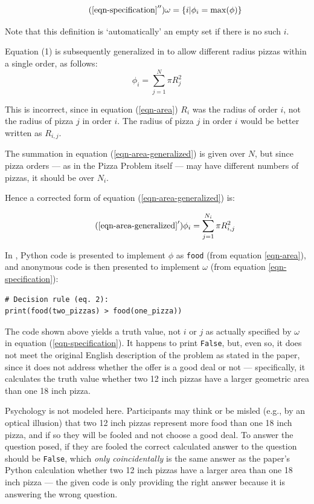 \documentclass[11pt]{article}
\begin{document}
\begin{equation}\tag{$\ref{eqn-specification}^{\prime\prime}$}\label{eqn-set-corrected-specification}
\omega=\left\{i| \phi_i=\max(\phi)\right\}
\end{equation}

Note that this definition is `automatically' an empty set if there is no such $i$.

Equation (1) is subsequently generalized in \cite{pizzap} to allow different radius pizzas within a single order, as follows:
\begin{equation}\label{eqn-area-generalized}
\phi_i=\sum_{j=1}^N \pi R_j^2
\end{equation}

This is incorrect, since in equation (\ref{eqn-area}) $R_i$ was the radius of order $i$, not the radius of pizza $j$ in order $i$. The radius of pizza $j$ in order $i$ would be better written as $R_{i,j}$. 

The summation in equation (\ref{eqn-area-generalized}) is given over $N$, but since pizza orders --- as in the Pizza Problem itself --- may have different numbers of pizzas, it should be over $N_i$.

Hence a corrected form of equation (\ref{eqn-area-generalized}) is:

\begin{equation}\tag{$\ref{eqn-area-generalized}^\prime$}\label{eqn-corrected-area-generalized}
\phi_i=\sum_{j=1}^{N_i} \pi R_{i,j}^2
\end{equation}

In \cite{pizzap}, Python code is presented to implement $\phi$ as \texttt{food} (from equation \ref{eqn-area}), and anonymous code is then presented to implement $\omega$ (from equation \ref{eqn-specification}): 

\begin{verbatim}
# Decision rule (eq. 2): 
print(food(two_pizzas) > food(one_pizza))
\end{verbatim}

The code shown above yields a truth value, not $i$ or $j$ as actually specified by $\omega$ in equation (\ref{eqn-specification}). It happens to print \texttt{False}, but, even so, it does not meet the original English description of the problem as stated in the paper, since it does not address whether the offer is a good deal or not --- specifically, it calculates the truth value whether two 12 inch pizzas have a larger geometric area than one 18 inch pizza. 

Psychology is not modeled here. Participants may think or be misled (e.g., by an optical illusion) that two 12 inch pizzas represent more food than one 18 inch pizza, and if so they will be fooled and not choose a good deal. To answer the question posed, if they are fooled the correct calculated answer to the question should be \texttt{False}, which \emph{only coincidentally\/} is the same answer as the paper's Python calculation whether two 12 inch pizzas have a larger area than one 18 inch pizza --- the given code is only providing the right answer because it is answering the wrong question. 
\end{document}
